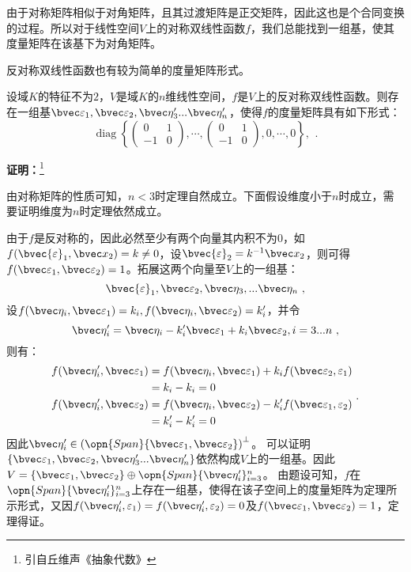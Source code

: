 由于对称矩阵相似于对角矩阵，且其过渡矩阵是正交矩阵，因此这也是个合同变换的过程。所以对于线性空间$V$上的对称双线性函数$f$，我们总能找到一组基，使其度量矩阵在该基下为对角矩阵。

反对称双线性函数也有较为简单的度量矩阵形式。
\begin{theorem}{}\label{the_BiFunc_1}
设域$K$的特征不为$2$，$V$是域$K$的$n$维线性空间，$f$是$V$上的反对称双线性函数。则存在一组基$\bvec \varepsilon_1,\bvec \varepsilon_2,\bvec \eta'_3...\bvec \eta'_n$，使得$f$的度量矩阵具有如下形式：
\begin{equation}
\operatorname{diag}\left\{\left(\begin{array}{rr}
0 & 1 \\
-1 & 0
\end{array}\right), \cdots,\left(\begin{array}{rr}
0 & 1 \\
-1 & 0
\end{array}\right), 0, \cdots, 0\right\} \text {, }
~.\end{equation}
\end{theorem}
\textbf{证明：}\footnote{引自丘维声《抽象代数》}

由对称矩阵的性质可知，$n< 3$时定理自然成立。下面假设维度小于$n$时成立，需要证明维度为$n$时定理依然成立。

由于$f$是反对称的，因此必然至少有两个向量其内积不为$0$，如$f(\bvec {\varepsilon}_1,\bvec x_2)=k\neq 0$，设$\bvec {\varepsilon}_2=k^{-1}\bvec x_2$，则可得$f(\bvec\varepsilon_1,\bvec\varepsilon_2)=1$。拓展这两个向量至$V$上的一组基：
\begin{equation}
\bvec {\varepsilon}_1,\bvec \varepsilon_2,\bvec\eta_3,...\bvec\eta_n~,
\end{equation}
设$f(\bvec \eta_i,\bvec\varepsilon_1)=k_i,f(\bvec \eta_i,\bvec\varepsilon_2)=k'_i$，并令
\begin{equation}
\bvec\eta'_i=\bvec \eta_i-k'_i\bvec\varepsilon_1+k_i\bvec\varepsilon_2,i=3...n~,
\end{equation}
则有：
\begin{equation}
\begin{aligned}
f(\bvec \eta'_i,\bvec\varepsilon_1)&=f(\bvec\eta_i,\bvec\varepsilon_1)+k_if(\bvec\varepsilon_2,\varepsilon_1)\\
&=k_i-k_i=0\\
f(\bvec \eta'_i,\bvec\varepsilon_2)&=f(\bvec\eta_i,\bvec\varepsilon_2)-k'_if(\bvec\varepsilon_1,\varepsilon_2)\\
&=k'_i-k'_i=0
\end{aligned}~.
\end{equation}
因此$\bvec \eta'_i\in \left(\opn{Span}\{\bvec\varepsilon_1,\bvec\varepsilon_2\}\right)^{\bot}$。
可以证明$\{\bvec\varepsilon_1,\bvec\varepsilon_2,\bvec\eta'_3...\bvec\eta'_n\}$依然构成$V$上的一组基。因此$V=\{\bvec\varepsilon_1,\bvec\varepsilon_2\}\oplus \opn{Span}\{\bvec\eta'_i\}_{i=3}^n$。
由题设可知，$f$在$ \opn{Span}\{\bvec\eta'_i\}_{i=3}^n$上存在一组基，使得在该子空间上的度量矩阵为定理所示形式，又因$f(\bvec \eta'_i,\varepsilon_1)=f(\bvec \eta'_i,\varepsilon_2)=0$及$f(\bvec\varepsilon_1,
\bvec\varepsilon_2)=1$，定理得证。
